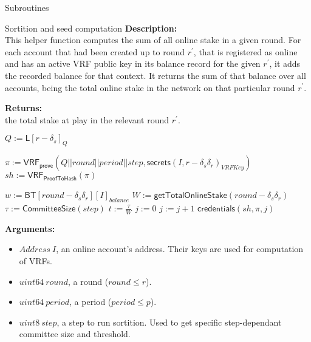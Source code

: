 \documentclass[10pt,a4paper]{article}
\begin{document}
\begin{section}{Subroutines}
\begin{subsection}{Sortition and seed computation}
\noindent \textbf{Description:}\\
This helper function computes the sum of all online stake in a given round.
For each account that had been created up to round $r^\prime$, that is registered as online 
and has an active VRF public key in its balance record for the given $r^\prime$, 
it adds the recorded balance for that context.
It returns the sum of that balance over all accounts, being the total online stake
in the network on that particular round $r^\prime$.

\noindent \textbf{Returns:} \\
the total stake at play in the relevant round $r^\prime$.


\begin{algorithm}[H]
    \caption{Sortition}
    \label{algo:sortition}
    \begin{algorithmic}[1]
        \State $Q := \mathsf{L}[r - \delta_s]_{Q}$

        \State $\pi := \mathsf{VRF_{prove}}(Q||round||period||step, \mathsf{secrets}(I, r-\delta_s\delta_r)_{VRFKey})$
        \State $sh := \mathsf{VRF_{ProofToHash}}(\pi)$

        \State $w := \mathsf{BT}[round-\delta_s\delta_r][I]_{balance}$
        \State $W := \mathsf{getTotalOnlineStake}(round-\delta_s\delta_r)$
        \State $\tau := \mathsf{CommitteeSize}(step)$
        \State $t := \frac{\tau}{W}$
        \State $j := 0$
        \While{$\frac{sh}{2^{\mathsf{log_2}(sh)}}\notin [ \sum_{k=0}^j\mathsf{B}(k;w,t), \sum_{k=0}^{j+1}\mathsf{B}(k;w,t))$}
            \State $j := j+1$
        \EndWhile
        \Return $\mathsf{credentials}(sh, \pi, j)$
    \EndFunction
    \end{algorithmic}
    \caption{\underline{Sortition}}
\end{algorithm}


\noindent \textbf{Arguments:}
\begin{itemize}
    \item $Address \ I$, an online account's address. Their keys are used for computation of VRFs.
    \item $uint64 \ round$, a round ($round \leq r$).
    \item $uint64 \ period$, a period ($period \leq p$).
    \item $uint8 \ step$, a step to run sortition. Used to get specific step-dependant committee size and threshold.
\end{itemize}


\end{subsection}
\end{section}
\end{document}
